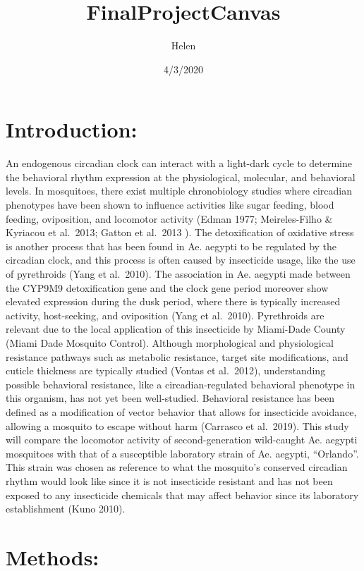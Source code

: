 \documentclass[]{article}
\title{FinalProjectCanvas}
\author{Helen}
\date{4/3/2020}
\begin{document}
\maketitle

\hypertarget{introduction}{%
\section{Introduction:}\label{introduction}}

An endogenous circadian clock can interact with a light-dark cycle to
determine the behavioral rhythm expression at the physiological,
molecular, and behavioral levels. In mosquitoes, there exist multiple
chronobiology studies where circadian phenotypes have been shown to
influence activities like sugar feeding, blood feeding, oviposition, and
locomotor activity (Edman 1977; Meireles-Filho \& Kyriacou et al.~2013;
Gatton et al.~2013 ). The detoxification of oxidative stress is another
process that has been found in Ae. aegypti to be regulated by the
circadian clock, and this process is often caused by insecticide usage,
like the use of pyrethroids (Yang et al.~2010). The association in Ae.
aegypti made between the CYP9M9 detoxification gene and the clock gene
period moreover show elevated expression during the dusk period, where
there is typically increased activity, host-seeking, and oviposition
(Yang et al.~2010). Pyrethroids are relevant due to the local
application of this insecticide by Miami-Dade County (Miami Dade
Mosquito Control). Although morphological and physiological resistance
pathways such as metabolic resistance, target site modifications, and
cuticle thickness are typically studied (Vontas et al.~2012),
understanding possible behavioral resistance, like a circadian-regulated
behavioral phenotype in this organism, has not yet been well-studied.
Behavioral resistance has been defined as a modification of vector
behavior that allows for insecticide avoidance, allowing a mosquito to
escape without harm (Carrasco et al.~2019). This study will compare the
locomotor activity of second-generation wild-caught Ae. aegypti
mosquitoes with that of a susceptible laboratory strain of Ae. aegypti,
``Orlando''. This strain was chosen as reference to what the mosquito's
conserved circadian rhythm would look like since it is not insecticide
resistant and has not been exposed to any insecticide chemicals that may
affect behavior since its laboratory establishment (Kuno 2010).

\hypertarget{methods}{%
\section{Methods:}\label{methods}}
\end{document}
